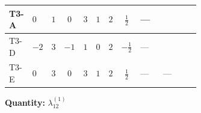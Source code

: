 \documentclass[8pt]{article}
\begin{document}
\begin{landscape}
\begin{longtable}{@{}llcccccc >{\raggedright\arraybackslash}p{0.21\linewidth} >{\raggedright\arraybackslash}p{0.21\linewidth} >{\raggedright\arraybackslash}p{0.21\linewidth}@{}}
\midrule
T3-A & $0$ & $1$ & $0$ & $3$ & $1$ & $2$ & $\frac{1}{2}$ & --- & \scriptsize\adjustbox{max width=\linewidth}{$\begin{gathered} -6 {g_1}^2 {\lambda_{12}^{(1)}}\end{gathered}$} & \scriptsize\adjustbox{max width=\linewidth}{$\begin{gathered} +4 {\lambda_{12}^{(1)}}^2\end{gathered}$} \\
\midrule
T3-D & $-2$ & $3$ & $-1$ & $1$ & $0$ & $2$ & $-\frac{1}{2}$ & --- & \scriptsize\adjustbox{max width=\linewidth}{$\begin{gathered} -6 {g_1}^2 {\lambda_{12}^{(1)}}\end{gathered}$} & \scriptsize\adjustbox{max width=\linewidth}{$\begin{gathered} +4 {\lambda_{12}^{(1)}}^2\end{gathered}$} \\
\midrule
T3-E & $0$ & $3$ & $0$ & $3$ & $1$ & $2$ & $\frac{1}{2}$ & --- & --- & \scriptsize\adjustbox{max width=\linewidth}{$\begin{gathered} +4 {\lambda_{12}^{(1)}}^2\end{gathered}$} \\
\midrule
\bottomrule
\end{longtable}
\clearpage
\noindent\textbf{Quantity: }$\lambda_{12}^{(1)}$\par\smallskip

\end{landscape}
\end{document}
